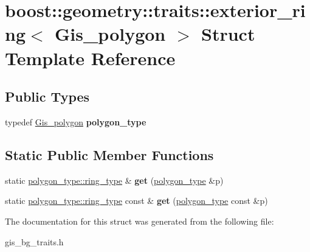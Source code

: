 \hypertarget{structboost_1_1geometry_1_1traits_1_1exterior__ring_3_01Gis__polygon_01_4}{}\section{boost\+:\+:geometry\+:\+:traits\+:\+:exterior\+\_\+ring$<$ Gis\+\_\+polygon $>$ Struct Template Reference}
\label{structboost_1_1geometry_1_1traits_1_1exterior__ring_3_01Gis__polygon_01_4}
\subsection*{Public Types}
\begin{DoxyCompactItemize}
\item 
\mbox{\label{structboost_1_1geometry_1_1traits_1_1exterior__ring_3_01Gis__polygon_01_4_a690cf422a922784acec2425fbc5b48fb}} 
typedef \mbox{\hyperlink{classGis__polygon}{Gis\+\_\+polygon}} {\bfseries polygon\+\_\+type}
\end{DoxyCompactItemize}
\subsection*{Static Public Member Functions}
\begin{DoxyCompactItemize}
\item 
\mbox{\label{structboost_1_1geometry_1_1traits_1_1exterior__ring_3_01Gis__polygon_01_4_a7dc2c89a7fc23f7f2a153676d9be0404}} 
static \mbox{\hyperlink{classGis__polygon__ring}{polygon\+\_\+type\+::ring\+\_\+type}} \& {\bfseries get} (\mbox{\hyperlink{classGis__polygon}{polygon\+\_\+type}} \&p)
\item 
\mbox{\label{structboost_1_1geometry_1_1traits_1_1exterior__ring_3_01Gis__polygon_01_4_a199142dfc0068d51da282afa3f1230cb}} 
static \mbox{\hyperlink{classGis__polygon__ring}{polygon\+\_\+type\+::ring\+\_\+type}} const  \& {\bfseries get} (\mbox{\hyperlink{classGis__polygon}{polygon\+\_\+type}} const \&p)
\end{DoxyCompactItemize}


The documentation for this struct was generated from the following file\+:\begin{DoxyCompactItemize}
\item 
gis\+\_\+bg\+\_\+traits.\+h\end{DoxyCompactItemize}
